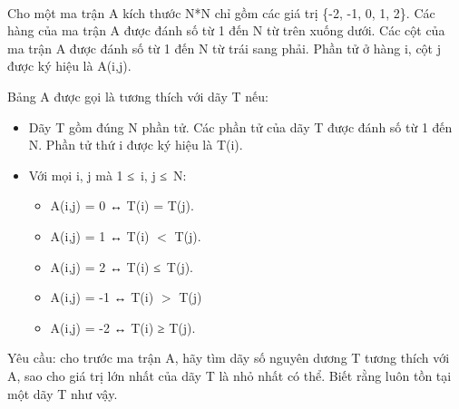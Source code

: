  

Cho một ma trận A kích thước N*N chỉ gồm các giá trị \{-2, -1, 0, 1, 2\}. Các hàng của ma trận A được đánh số từ 1 đến N từ trên xuống dưới. Các cột của ma trận A được đánh số từ 1 đến N từ trái sang phải. Phần tử ở hàng i, cột j được ký hiệu là A(i,j).

Bảng A được gọi là tương thích với dãy T nếu:
\begin{itemize}
	\item Dãy T gồm đúng N phần tử. Các phần tử của dãy T được đánh số từ 1 đến N. Phần tử thứ i được ký hiệu là T(i).
	\item Với mọi i, j mà 1 ≤ i, j ≤ N:
\begin{itemize}
	\item A(i,j) = 0 ↔ T(i) = T(j).
	\item A(i,j) = 1 ↔ T(i) $<$ T(j).
	\item A(i,j) = 2 ↔ T(i) ≤ T(j).
	\item A(i,j) = -1 ↔ T(i) $>$ T(j)
	\item A(i,j) = -2 ↔ T(i) ≥ T(j).
\end{itemize}
\end{itemize}

Yêu cầu: cho trước ma trận A, hãy tìm dãy số nguyên dương T tương thích với A, sao cho giá trị lớn nhất của dãy T là nhỏ nhất có thể. Biết rằng luôn tồn tại một dãy T như vậy.

 